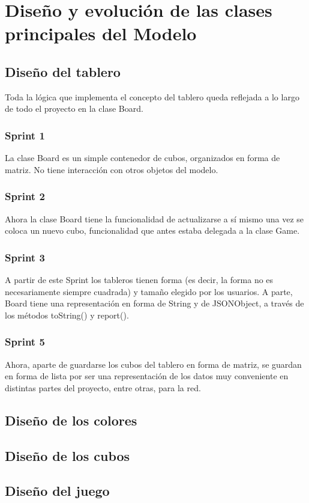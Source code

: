 \documentclass{article}
\begin{document}
\section{Diseño y evolución de las clases principales del Modelo}

\subsection{Diseño del tablero}
Toda la lógica que implementa el concepto del tablero queda reflejada a lo largo de todo el proyecto en la clase Board.
\subsubsection{Sprint 1}
La clase Board es un simple contenedor de cubos, organizados en forma de matriz.
No tiene interacción con otros objetos del modelo.
\subsubsection{Sprint 2}
Ahora la clase Board tiene la funcionalidad de actualizarse a sí mismo una vez se coloca un nuevo cubo, funcionalidad que antes estaba delegada a la clase Game.
\subsubsection{Sprint 3}
A partir de este Sprint los tableros tienen forma (es decir, la forma no es necesariamente siempre cuadrada) y tamaño elegido por los usuarios. A parte, Board tiene una representación en forma de String y de JSONObject, a través de los métodos toString() y report().
\subsubsection{Sprint 5}
Ahora, aparte de guardarse los cubos del tablero en forma de matriz, se guardan en forma de lista por ser una representación de los datos muy conveniente en distintas partes del proyecto, entre otras, para la red.
\subsection{Diseño de los colores}

\subsection{Diseño de los cubos}

\subsection{Diseño del juego}
\end{document}

